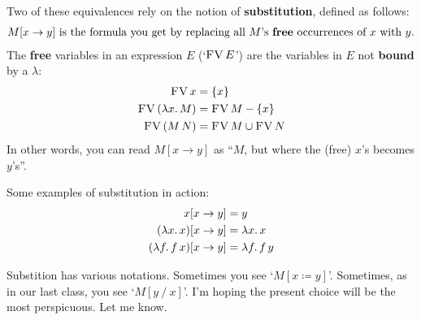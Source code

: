 \documentclass{article}
\newcommand{\con}[1]{\textsf{\textsc{#1}}}
\newcommand{\set}[1]{\ensuremath{\{ #1 \}}}
\newcommand{\ceq}{\coloneqq}
\newcommand{\ra}{\rightarrow}
\begin{document}
Two of these equivalences rely on the notion of \textbf{substitution}, defined
as follows: 
\begin{align}
  \notag
  M[x \ra y] \text{~is the formula you get by replacing all $M$'s \textbf{free}
  occurrences of $x$ with $y$.}
\end{align}
%
The \textbf{free} variables in an expression $E$ (`$\con{FV}\,E$') are the
variables in $E$ not \textbf{bound} by a $\lambda$:
\begin{align}
  \notag
  \begin{array}{r@{}c@{}l}
    \con{FV}\,x & {}={} & \set{x}
    \\[.35em] 
    \con{FV}\,(\lambda x.\,M) & {}={} & \con{FV}\,M - \set{x}
    \\[.35em]  
    \con{FV}\,(M\,N) & {}={} & \con{FV}\,M \cup \con{FV}\,N
  \end{array}
\end{align}
%
In other words, you can read $M[x \ra y]$ as ``$M$, but where the (free) $x$'s
becomes $y$'s''.

Some examples of substitution in action: 
\begin{align}
  \notag
  x[x \ra y] &= y
  \\\notag
  (\lambda x.\,x)[x \ra y] &= \lambda x.\,x
  \\\notag
  (\lambda f.\,f\,x)[x \ra y] &= \lambda f.\, f\, y
\end{align}

Substition has various notations. Sometimes you see `$M[x \ceq y]$'. Sometimes,
as in our last class, you see `$M[y\mathrel/x]$'. I'm hoping the present choice
will be the most perspicuous. Let me know.
\end{document}
